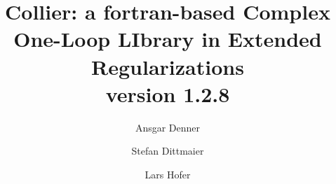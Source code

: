 \documentclass[preprint,sort&compress,12pt]{elsarticle}
\newcommand{\collier}{{\sc Collier}}
\begin{document}
\begin{frontmatter}



\title{\collier: {a fortran-based  Complex One-Loop LIbrary in
  Extended Regularizations}\\
  version 1.2.8}


\author[ad]{Ansgar Denner}

\author[sd]{Stefan Dittmaier}

\author[lh]{Lars Hofer}


\address[ad]{Universit\"at W\"urzburg, 
Institut f\"ur Theoretische Physik und Astrophysik, \\
D-97074 W\"urzburg, Germany}
\address[sd]{Albert-Ludwigs-Universit\"at Freiburg, Physikalisches Institut, 
\\ D-79104 Freiburg, Germany}
\address[lh]{Department de F\'isica Qu\`antica i Astrof\'isica (FQA), \\
Institut de Ci\`encies del Cosmos (ICCUB), \\
Universitat de Barcelona (UB),
Mart\'i Franqu\`es 1, \\
E-08028 Barcelona, Spain}


\end{frontmatter}
\end{document}

